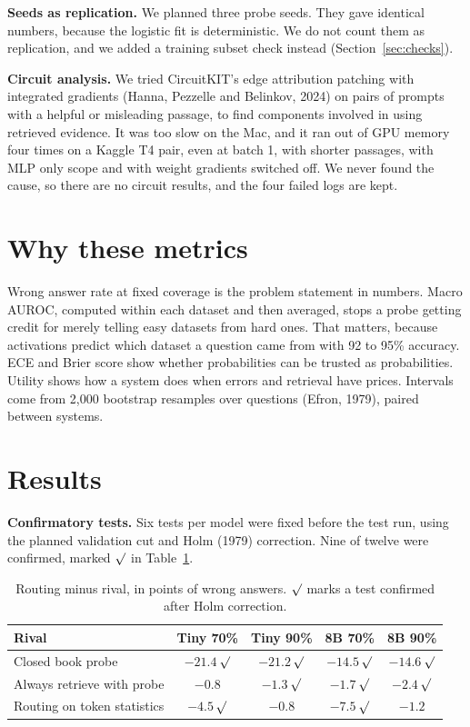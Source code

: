 \documentclass[11pt,a4paper]{article}
\newcommand{\ok}{\,\checkmark}
\renewcommand{\checkmark}{\ensuremath{\surd}}
\begin{document}
\textbf{Seeds as replication.} We planned three probe seeds. They gave identical numbers, because the logistic fit is deterministic. We do not count them as replication, and we added a training subset check instead (Section~\ref{sec:checks}).

\textbf{Circuit analysis.} We tried CircuitKIT's edge attribution patching with integrated gradients (Hanna, Pezzelle and Belinkov, 2024) on pairs of prompts with a helpful or misleading passage, to find components involved in using retrieved evidence. It was too slow on the Mac, and it ran out of GPU memory four times on a Kaggle T4 pair, even at batch 1, with shorter passages, with MLP only scope and with weight gradients switched off. We never found the cause, so there are no circuit results, and the four failed logs are kept.

\section{Why these metrics}

Wrong answer rate at fixed coverage is the problem statement in numbers. Macro AUROC, computed within each dataset and then averaged, stops a probe getting credit for merely telling easy datasets from hard ones. That matters, because activations predict which dataset a question came from with 92 to 95\% accuracy. ECE and Brier score show whether probabilities can be trusted as probabilities. Utility shows how a system does when errors and retrieval have prices. Intervals come from 2,000 bootstrap resamples over questions (Efron, 1979), paired between systems.

\section{Results}

\textbf{Confirmatory tests.} Six tests per model were fixed before the test run, using the planned validation cut and Holm (1979) correction. Nine of twelve were confirmed, marked \checkmark{} in Table~\ref{tab:tests}.

\begin{table}[h]
\centering\small
\caption{Routing minus rival, in points of wrong answers. \checkmark{} marks a test confirmed after Holm correction.}
\label{tab:tests}
\begin{tabular}{lcccc}
\toprule
Rival & Tiny 70\% & Tiny 90\% & 8B 70\% & 8B 90\%\\
\midrule
Closed book probe & $-21.4$\ok & $-21.2$\ok & $-14.5$\ok & $-14.6$\ok\\
Always retrieve with probe & $-0.8$ & $-1.3$\ok & $-1.7$\ok & $-2.4$\ok\\
Routing on token statistics & $-4.5$\ok & $-0.8$ & $-7.5$\ok & $-1.2$\\
\bottomrule
\end{tabular}
\end{table}
\end{document}
